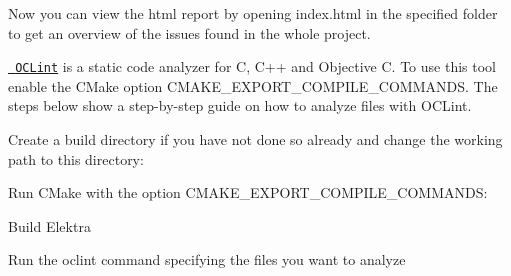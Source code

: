 \begin{DoxyCode}{0}
\end{DoxyCode}


Now you can view the html report by opening {\ttfamily index.\+html} in the specified folder to get an overview of the issues found in the whole project.

\href{http://oclint.org/}{\texttt{ O\+C\+Lint}} is a static code analyzer for C, C++ and Objective C. To use this tool enable the C\+Make option {\ttfamily C\+M\+A\+K\+E\+\_\+\+E\+X\+P\+O\+R\+T\+\_\+\+C\+O\+M\+P\+I\+L\+E\+\_\+\+C\+O\+M\+M\+A\+N\+DS}. The steps below show a step-\/by-\/step guide on how to analyze files with O\+C\+Lint.


\begin{DoxyEnumerate}
\item Create a build directory if you have not done so already and change the working path to this directory\+:
\end{DoxyEnumerate}


\begin{DoxyCode}{0}
\end{DoxyCode}



\begin{DoxyEnumerate}
\item Run C\+Make with the option {\ttfamily C\+M\+A\+K\+E\+\_\+\+E\+X\+P\+O\+R\+T\+\_\+\+C\+O\+M\+P\+I\+L\+E\+\_\+\+C\+O\+M\+M\+A\+N\+DS}\+:
\end{DoxyEnumerate}


\begin{DoxyCode}{0}
\end{DoxyCode}



\begin{DoxyEnumerate}
\item Build Elektra
\end{DoxyEnumerate}


\begin{DoxyCode}{0}
\end{DoxyCode}



\begin{DoxyEnumerate}
\item Run the {\ttfamily oclint} command specifying the files you want to analyze
\end{DoxyEnumerate}


